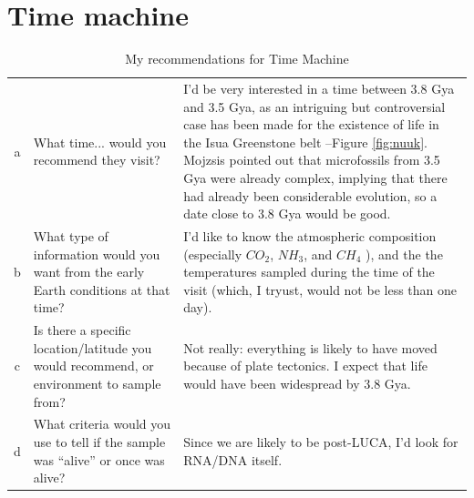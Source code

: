 \documentclass[]{article}
\begin{document}
\section{Time machine}

\begin{table}[H]
	\caption{My recommendations for Time Machine}
	{
	\begin{tabular}{|c|p{3cm}|p{8cm}| } \hline
		a&What time... would you recommend they visit? &I'd be very interested in a time between 3.8 Gya and 3.5 Gya, as an intriguing but controversial case has been made for the existence of life \cite{mojzsis1996evidence,nutman2016rapid} in the Isua Greenstone belt \cite{enwiki:1095301862}--Figure \ref{fig:nuuk}. Mojzsis\cite{mojzsis1996evidence} pointed out that microfossils from 3.5 Gya were already complex, implying that there had already been considerable evolution, so a date close to 3.8 Gya would be good.\\
		b& What type of information would you want from the early Earth conditions at that
		time?& I'd like to know the atmospheric composition (especially $CO_2$, $NH_3$, and $CH_4$ ), and the the temperatures sampled during the time of the visit (which, I tryust, would not be less than one day).\\
		c& Is there a specific location/latitude you would recommend, or environment to sample		from? &Not really: everything is likely to have moved because of plate tectonics. I expect that life would have been widespread by 3.8 Gya.\\
		d& What criteria would you use to tell if the sample was “alive” or once was alive? &Since we are likely to be post-LUCA, I'd look for RNA/DNA itself.\\\hline
	\end{tabular}}
\end{table}
\end{document}
